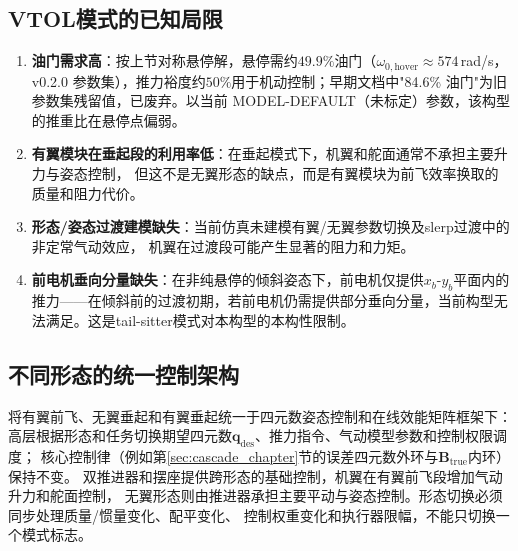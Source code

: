 \subsection{VTOL模式的已知局限}

\begin{enumerate}[label=(\arabic*)]
    \item \textbf{油门需求高}：按上节对称悬停解，悬停需约$49.9\%$油门（$\omega_{0,\text{hover}}\approx574$\,rad/s，v0.2.0 参数集），推力裕度约$50\%$用于机动控制；早期文档中"84.6\% 油门"为旧参数集残留值，已废弃。以当前 MODEL-DEFAULT（未标定）参数，该构型的推重比在悬停点偏弱。
    \item \textbf{有翼模块在垂起段的利用率低}：在垂起模式下，机翼和舵面通常不承担主要升力与姿态控制，
          但这不是无翼形态的缺点，而是有翼模块为前飞效率换取的质量和阻力代价。
    \item \textbf{形态/姿态过渡建模缺失}：当前仿真未建模有翼/无翼参数切换及slerp过渡中的非定常气动效应，
          机翼在过渡段可能产生显著的阻力和力矩。
    \item \textbf{前电机垂向分量缺失}：在非纯悬停的倾斜姿态下，前电机仅提供$x_b$-$y_b$平面内的推力——在倾斜前的过渡初期，若前电机仍需提供部分垂向分量，当前构型无法满足。这是tail-sitter模式对本构型的本构性限制。
\end{enumerate}

\subsection{不同形态的统一控制架构}

将有翼前飞、无翼垂起和有翼垂起统一于四元数姿态控制和在线效能矩阵框架下：
高层根据形态和任务切换期望四元数$\mathbf{q}_{\text{des}}$、推力指令、气动模型参数和控制权限调度；
核心控制律（例如第\ref{sec:cascade_chapter}节的误差四元数外环与$\mathbf{B}_{\text{true}}$内环）保持不变。
双推进器和摆座提供跨形态的基础控制，机翼在有翼前飞段增加气动升力和舵面控制，
无翼形态则由推进器承担主要平动与姿态控制。形态切换必须同步处理质量/惯量变化、配平变化、
控制权重变化和执行器限幅，不能只切换一个模式标志。
